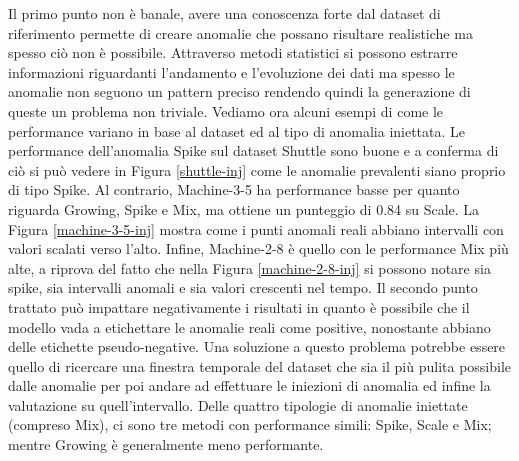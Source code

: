 Il primo punto non è banale, avere una conoscenza forte dal dataset di riferimento permette di creare anomalie che possano risultare realistiche ma spesso ciò non è possibile. Attraverso metodi statistici si possono estrarre informazioni riguardanti l'andamento e l'evoluzione dei dati ma spesso le anomalie non seguono un pattern preciso rendendo quindi la generazione di queste un problema non triviale. 
Vediamo ora alcuni esempi di come le performance variano in base al dataset ed al tipo di anomalia iniettata. Le performance dell'anomalia Spike sul dataset Shuttle sono buone e a conferma di ciò si può vedere in Figura \ref{shuttle-inj} come le anomalie prevalenti siano proprio di tipo Spike.
Al contrario, Machine-3-5 ha performance basse per quanto riguarda Growing, Spike e Mix, ma ottiene un punteggio di 0.84 su Scale. La Figura \ref{machine-3-5-inj} mostra come i punti anomali reali abbiano intervalli con valori scalati verso l'alto. Infine, Machine-2-8 è quello con le performance Mix più alte, a riprova del fatto che nella Figura \ref{machine-2-8-inj} si possono notare sia spike, sia intervalli anomali e sia valori crescenti nel tempo.
Il secondo punto trattato può impattare negativamente i risultati in quanto è possibile che il modello vada a etichettare le anomalie reali come positive, nonostante abbiano delle etichette pseudo-negative. Una soluzione a questo problema potrebbe essere quello di ricercare una finestra temporale del dataset che sia il più pulita possibile dalle anomalie per poi andare ad effettuare le iniezioni di anomalia ed infine la valutazione su quell'intervallo.
Delle quattro tipologie di anomalie iniettate (compreso Mix), ci sono tre metodi con performance simili: Spike, Scale e Mix; mentre Growing è generalmente meno performante.
